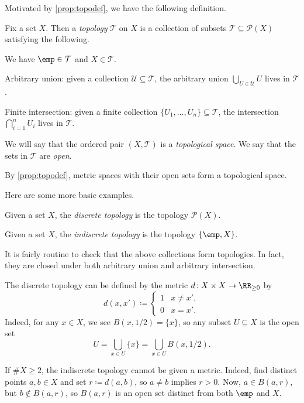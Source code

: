 \documentclass[../notes.tex]{subfiles}
\begin{document}
Motivated by \autoref{prop:topodef}, we have the following definition.
\begin{definition}[Topology]
	Fix a set $X$. Then a \textit{topology} $\mathcal T$ on $X$ is a collection of subsets $\mathcal T\subseteq\mathcal P(X)$ satisfying the following.
	\begin{listalph}
		\item We have $\emp\in\mathcal T$ and $X\in\mathcal T$.
		\item Arbitrary union: given a collection $\mathcal U\subseteq\mathcal T$, the arbitrary union $\bigcup_{U\in\mathcal U}U$ lives in $\mathcal T$.
		\item Finite intersection: given a finite collection $\{U_1,\ldots,U_n\}\subseteq\mathcal T$, the intersection $\bigcap_{i=1}^nU_i$ lives in $\mathcal T$.
	\end{listalph}
	We will say that the ordered pair $(X,\mathcal T)$ is a \textit{topological space}. We say that the sets in $\mathcal T$ are \textit{open}.
\end{definition}
\begin{example} \label{ex:metrictopo}
	By \autoref{prop:topodef}, metric spaces with their open sets form a topological space.
\end{example}
Here are some more basic examples.
\begin{defihelper} 
	Given a set $X$, the \textit{discrete topology} is the topology $\mathcal P(X)$.
\end{defihelper}
\begin{defihelper} 
	Given a set $X$, the \textit{indiscrete topology} is the topology $\{\emp,X\}$.
\end{defihelper}
It is fairly routine to check that the above collections form topologies. In fact, they are closed under both arbitrary union and arbitrary intersection.
\begin{remark}
	The discrete topology can be defined by the metric $d\colon X\times X\to\RR_{\ge0}$ by
	\[d(x,x')\coloneqq\begin{cases}
		1 & x\ne x', \\
		0 & x=x'.
	\end{cases}\]
	Indeed, for any $x\in X$, we see $B(x,1/2)=\{x\}$, so any subset $U\subseteq X$ is the open set
	\[U=\bigcup_{x\in U}\{x\}=\bigcup_{x\in U}B(x,1/2).\]
\end{remark}
\begin{remark}
	If $\#X\ge2$, the indiscrete topology cannot be given a metric. Indeed, find distinct points $a,b\in X$ and set $r\coloneqq d(a,b)$, so $a\ne b$ implies $r>0$. Now, $a\in B(a,r)$, but $b\notin B(a,r)$, so $B(a,r)$ is an open set distinct from both $\emp$ and $X$.
\end{remark}
\end{document}
